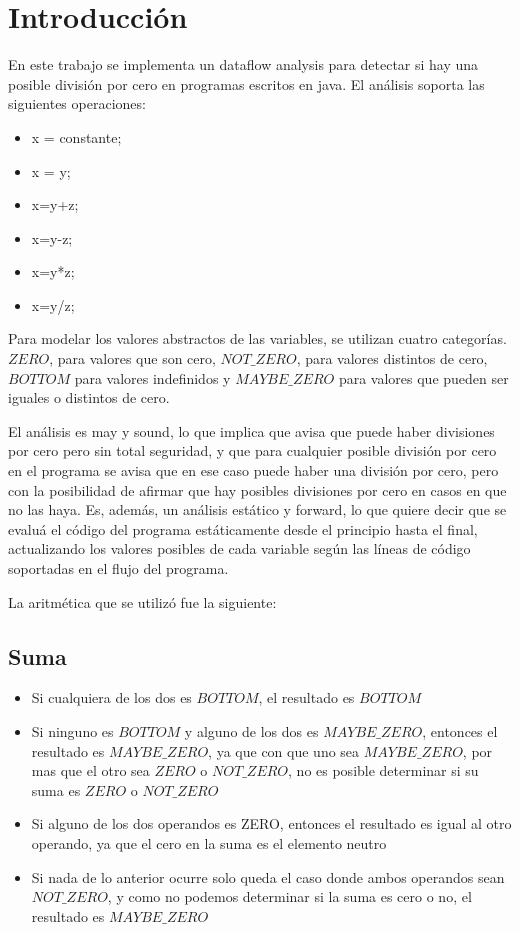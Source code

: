 \section*{Introducción}
En este trabajo se implementa un dataflow analysis para detectar si hay una posible división por cero en programas escritos en java. El análisis soporta las siguientes operaciones:

\begin{itemize}
\item x = constante; 
\item x = y;
\item x=y+z;
\item x=y-z;
\item x=y*z;
\item x=y/z;
\end{itemize}

Para modelar los valores abstractos de las variables, se utilizan cuatro categorías. $ZERO$, para valores que son cero, $NOT\_ZERO$, para valores distintos de cero, $BOTTOM$ para valores indefinidos y $MAYBE\_ZERO$ para valores que pueden ser iguales o distintos de cero.

El análisis es may y sound, lo que implica que avisa que puede haber divisiones por cero pero sin total seguridad, y que para cualquier posible división por cero en el programa se avisa que en ese caso puede haber una división por cero, pero con la posibilidad de afirmar que hay posibles divisiones por cero en casos en que no las haya. Es, además, un análisis estático y forward, lo que quiere decir que se evaluá el código del programa estáticamente desde el principio hasta el final, actualizando los valores posibles de cada variable según las líneas de código soportadas en el flujo del programa.

La aritmética que se utilizó fue la siguiente:

\subsection*{Suma}
\begin{itemize}
\item Si cualquiera de los dos es $BOTTOM$, el resultado es $BOTTOM$ \\
\item Si ninguno es $BOTTOM$ y alguno de los dos es $MAYBE\_ZERO$, entonces el resultado es $MAYBE\_ZERO$, ya que con que uno sea $MAYBE\_ZERO$, por mas que el otro sea $ZERO$ o $NOT\_ZERO$, no es posible determinar si su suma es $ZERO$ o $NOT\_ZERO$ \\
\item Si alguno de los dos operandos es ZERO, entonces el resultado es igual al otro operando, ya que el cero en la suma es el elemento neutro \\
\item Si nada de lo anterior ocurre solo queda el caso donde ambos operandos sean $NOT\_ZERO$, y como no podemos determinar si la suma es cero o no, el resultado es $MAYBE\_ZERO$
\end{itemize}


